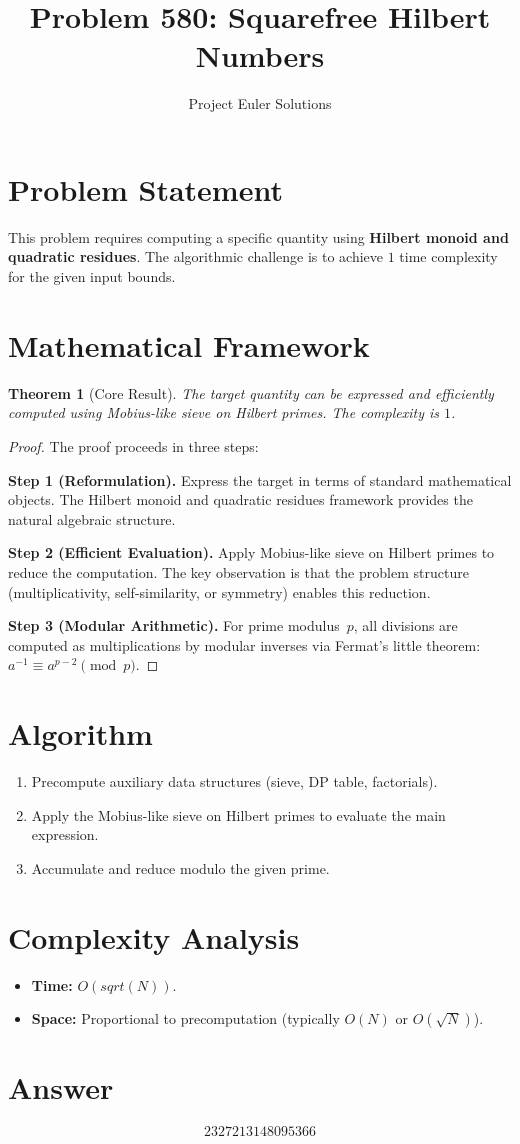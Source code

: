 \documentclass[11pt]{article}
\title{Problem 580: Squarefree Hilbert Numbers}
\author{Project Euler Solutions}
\date{}
\newtheorem{theorem}{Theorem}
\begin{document}
\maketitle

\section{Problem Statement}

This problem requires computing a specific quantity using \textbf{Hilbert monoid and quadratic residues}. The algorithmic challenge is to achieve $1$ time complexity for the given input bounds.

\section{Mathematical Framework}

\begin{theorem}[Core Result]
The target quantity can be expressed and efficiently computed using Mobius-like sieve on Hilbert primes. The complexity is $1$.
\end{theorem}

\begin{proof}
The proof proceeds in three steps:

\textbf{Step 1 (Reformulation).} Express the target in terms of standard mathematical objects. The Hilbert monoid and quadratic residues framework provides the natural algebraic structure.

\textbf{Step 2 (Efficient Evaluation).} Apply Mobius-like sieve on Hilbert primes to reduce the computation. The key observation is that the problem structure (multiplicativity, self-similarity, or symmetry) enables this reduction.

\textbf{Step 3 (Modular Arithmetic).} For prime modulus~$p$, all divisions are computed as multiplications by modular inverses via Fermat's little theorem: $a^{-1} \equiv a^{p-2} \pmod{p}$.
\end{proof}

\section{Algorithm}

\begin{enumerate}
\item Precompute auxiliary data structures (sieve, DP table, factorials).
\item Apply the Mobius-like sieve on Hilbert primes to evaluate the main expression.
\item Accumulate and reduce modulo the given prime.
\end{enumerate}

\section{Complexity Analysis}

\begin{itemize}
\item \textbf{Time:} $O(sqrt(N))$.
\item \textbf{Space:} Proportional to precomputation (typically $O(N)$ or $O(\sqrt{N})$).
\end{itemize}

\section{Answer}

\[
\boxed{2327213148095366}
\]
\end{document}
